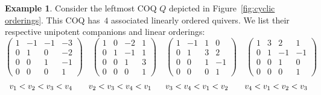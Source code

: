 \documentclass[11pt, letterpaper]{amsart}
\newcommand{\hide}[1]{}
\theoremstyle{definition}
\newtheorem{example}[theorem]{Example}
\numberwithin{equation}{section}
\begin{document}
{\begin{example}
\label{eg:unipotents}
Consider the leftmost COQ $Q$ depicted in Figure~\ref{fig:cyclic orderings}.
This COQ has~$4$ associated linearly ordered quivers. We list their respective unipotent companions and linear orderings:
$$\begin{pmatrix} 1 & -1 &  -1 & -3 \\ 0 & 1 & 0 & -2 \\ 0 & 0 & 1 & -1\\ 0 & 0 & 0 & 1 \end{pmatrix} 
\quad \begin{pmatrix} 1 & 0 &  -2 & 1 \\ 0 & 1 & -1 & 1 \\ 0 & 0 & 1 & 3\\ 0 & 0 & 0 & 1 \end{pmatrix} 
\quad \begin{pmatrix} 1 & -1 &  1 & 0 \\ 0 & 1 & 3 & 2 \\ 0 & 0 & 1 & -1\\ 0 & 0 & 0 & 1 \end{pmatrix}
\quad \begin{pmatrix} 1 & 3 &  2 & 1 \\ 0 & 1 & -1 & -1 \\ 0 & 0 & 1 & 0\\ 0 & 0 & 0 & 1 \end{pmatrix} $$
$$ \hspace{0.15cm} v_1< v_2< v_3<v_4 \quad \quad v_2< v_3<v_4 < v_1 \hspace{0.6cm} v_3<v_4 < v_1< v_2 \quad  \quad v_4 < v_1< v_2< v_3$$
\hide{
\begin{tabular}{ c c c c }
$\begin{pmatrix} 1 & -1 &  -1 & -3 \\ 0 & 1 & 0 & -2 \\ 0 & 0 & 1 & -1\\ 0 & 0 & 0 & 1 \end{pmatrix}$ &
$\quad \begin{pmatrix} 1 & 0 &  -2 & 1 \\ 0 & 1 & -1 & 1 \\ 0 & 0 & 1 & 3\\ 0 & 0 & 0 & 1 \end{pmatrix}$ & 
$\quad \begin{pmatrix} 1 & -1 &  1 & 0 \\ 0 & 1 & 3 & 2 \\ 0 & 0 & 1 & -1\\ 0 & 0 & 0 & 1 \end{pmatrix}$ &

\end{tabular}}
\end{example}}
\end{document}
